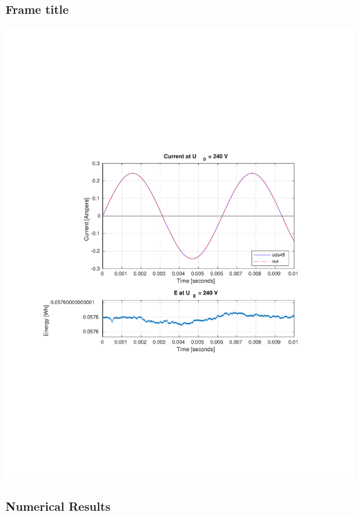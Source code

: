 \documentclass[aspectratio=1610]{beamer}
\begin{document}
\begin{frame}
  \frametitle{Frame title}
  
      \centerline{\includegraphics[scale=0.5]{figs/240V + E.pdf}}
  \begin{center}
  \end{center}	
  \end{frame}
\begin{frame}
\frametitle{Numerical Results}
\begin{columns}
\texttt{[image: \{figs/240V + E.pdf]}}
\end{columns}
\end{frame}
\end{document}
